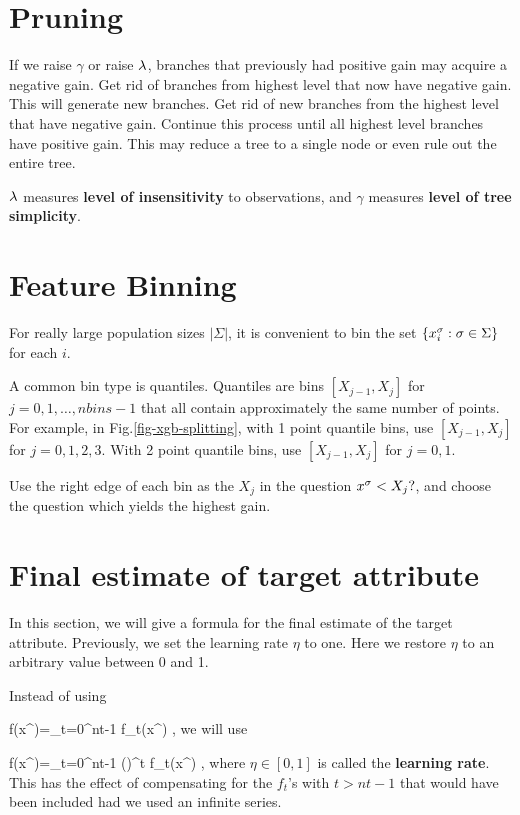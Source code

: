 \section{Pruning}
If we raise $\gamma$
or raise $\lambda$,  branches
that previously had positive gain
may acquire a negative gain.
Get rid 
of branches
from highest level that now have negative gain.
This will generate new branches.
Get rid of new branches
from the highest level that have
negative gain. Continue
this process until all
highest level branches have 
positive gain.
This may reduce a tree
to a single node
or even rule out the entire
tree.

$\lambda$ measures {\bf level of insensitivity}
to observations, and $\gamma$ measures
{\bf level of tree simplicity}.



\section{Feature Binning}

For really large population sizes $|\Sigma|$, 
it is convenient to bin the 
set $\{x^\sigma_i:\sigma\in \Sigma\}$
for each $i$. 

A common
bin type is quantiles. 
Quantiles are bins $[X_{j-1}, X_j]$
 for $j=0, 1, 
\ldots, nbins-1$ that 
all contain approximately
the same number of points.
For example, 
in Fig.\ref{fig-xgb-splitting},
with 1 point quantile bins,
use $[X_{j-1}, X_j]$ for $j=0,1,2,3$.
With 2 point quantile bins,
use $[X_{j-1}, X_j]$ for $j=0,1$.

Use the right edge 
of each bin as the $X_j$ in the question 
 $x^\sigma<X_j?$,
and choose the question which
yields the highest gain.


 


\section{Final estimate of
target attribute}

In this section,
we will
give a formula for the 
final estimate
of the target attribute.
Previously, we set
the learning rate $\eta$ to one.
Here we restore $\eta$
to an arbitrary value 
between 0 and 1.

Instead of using 

\beq
f(x^\s)=\sum_{t=0}^{nt-1} f_t(x^\s)
\;,
\eeq
we will use 

\beq
f(x^\s)=\sum_{t=0}^{nt-1} 
 (\eta)^t f_t(x^\s)
\;,
\eeq
where $\eta\in [0,1]$ is called 
the {\bf learning rate}.
This has the effect
of compensating for the $f_t$'s
with $t>nt-1$ that would
 have been included
had we used an infinite series.

